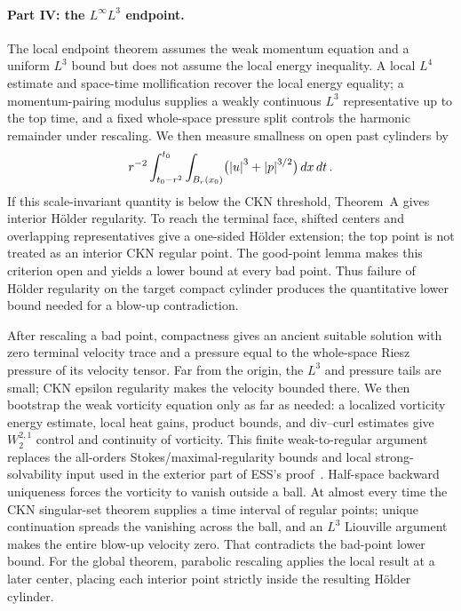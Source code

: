 \documentclass[11pt,letterpaper]{article}
\numberwithin{equation}{section}
\theoremstyle{plain}
\theoremstyle{definition}
\theoremstyle{remark}
\begin{document}
\paragraph{Part IV: the $L^\infty L^3$ endpoint.}
The local endpoint theorem assumes the weak momentum equation and a uniform $L^3$ bound but does not assume the local energy inequality. A local $L^4$ estimate and space-time mollification recover the local energy equality; a momentum-pairing modulus supplies a weakly continuous $L^3$ representative up to the top time, and a fixed whole-space pressure split controls the harmonic remainder under rescaling. We then measure smallness on open past cylinders by
\[
r^{-2}\int_{t_0-r^2}^{t_0}\int_{B_r(x_0)}\bigl(\left\lvert u\right\rvert^3+\left\lvert p\right\rvert^{3/2}\bigr)\,dx\,dt\,.
\]
If this scale-invariant quantity is below the CKN threshold, Theorem~A gives interior H\"older regularity. To reach the terminal face, shifted centers and overlapping representatives give a one-sided H\"older extension; the top point is not treated as an interior CKN regular point. The good-point lemma makes this criterion open and yields a lower bound at every bad point. Thus failure of H\"older regularity on the target compact cylinder produces the quantitative lower bound needed for a blow-up contradiction.

After rescaling a bad point, compactness gives an ancient suitable solution with zero terminal velocity trace and a pressure equal to the whole-space Riesz pressure of its velocity tensor. Far from the origin, the $L^3$ and pressure tails are small; CKN epsilon regularity makes the velocity bounded there. We then bootstrap the weak vorticity equation only as far as needed: a localized vorticity energy estimate, local heat gains, product bounds, and div--curl estimates give $W^{2,1}_2$ control and continuity of vorticity. This finite weak-to-regular argument replaces the all-orders Stokes/maximal-regularity bounds and local strong-solvability input used in the exterior part of ESS's proof~\cite[Theorem~1.4, §§3--5]{ESS2003}. Half-space backward uniqueness forces the vorticity to vanish outside a ball. At almost every time the CKN singular-set theorem supplies a time interval of regular points; unique continuation spreads the vanishing across the ball, and an $L^3$ Liouville argument makes the entire blow-up velocity zero. That contradicts the bad-point lower bound. For the global theorem, parabolic rescaling applies the local result at a later center, placing each interior point strictly inside the resulting H\"older cylinder.
\end{document}
